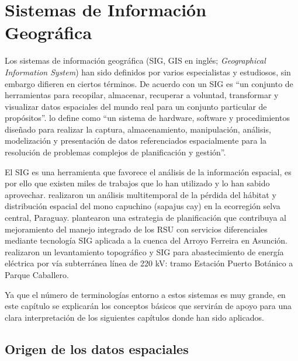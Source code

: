 \chapter{Sistemas de Información Geográfica}
\label{chap3}
\ifpdf
    \graphicspath{{Chapter3/Chapter3Figs/PNG/}{Chapter3/Chapter3Figs/PDF/}{Chapter3/Chapter3Figs/}}
\else
    \graphicspath{{Chapter3/Chapter3Figs/EPS/}{Chapter3/Chapter3Figs/}}
\fi


Los sistemas de información geográfica (SIG, GIS en inglés; \textit{Geographical Information System}) han sido definidos por varios especialistas y estudiosos, sin embargo difieren en ciertos términos. De acuerdo con \citet{Burrough1986PrinciplesAssessment} un SIG es “un conjunto de herramientas para recopilar, almacenar, recuperar a voluntad, transformar y visualizar datos espaciales del mundo real para un conjunto particular de propósitos”. \citet{NCGIA1990IntroductionGIS} lo define como “un sistema de hardware, software y procedimientos diseñado para realizar la captura, almacenamiento, manipulación, análisis, modelización y presentación de datos referenciados espacialmente para la resolución de problemas complejos de planificación y gestión”.

El SIG es una herramienta que favorece el análisis de la información espacial, es por ello que existen miles de trabajos que lo han utilizado y lo han sabido aprovechar. \citet{OsorioDominguez2018AnalisisParaguay} realizaron un análisis multitemporal de la pérdida del hábitat y distribución espacial del mono capuchino (sapajus cay) en la ecorregión selva central, Paraguay. \citet{Cabral2018EstrategiasAsuncion} plantearon una estrategia de planificación que contribuya al mejoramiento del manejo integrado de los RSU con servicios diferenciales mediante tecnología SIG aplicada a la cuenca del Arroyo Ferreira en Asunción. \citet{Acosta2006LevantamientoCaballero} realizaron un levantamiento topográfico y SIG para abastecimiento de energía eléctrica por vía subterránea línea de 220 kV: tramo Estación Puerto Botánico a Parque Caballero.

Ya que el número de terminologías entorno a estos sistemas es muy grande, en este capítulo se explicarán los conceptos básicos que servirán de apoyo para una clara interpretación de los siguientes capítulos donde han sido aplicados.

\section{Origen de los datos espaciales}

